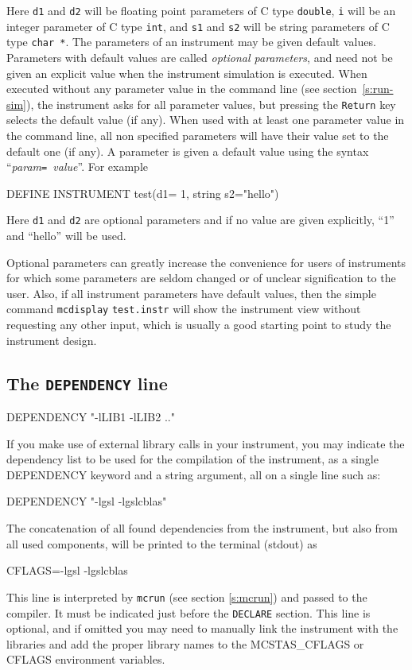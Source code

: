Here \verb+d1+ and \verb+d2+ will be floating point parameters of C type
\verb+double+, \verb+i+ will be an integer parameter of C type \verb+int+, and
\verb+s1+ and \verb+s2+ will be string parameters of C type \verb+char *+.
 The parameters of an instrument may
be given default values. Parameters with default values are called
\emph{optional parameters}, and need not be given an explicit value when the
instrument simulation is executed. When executed without any parameter value in
the command line (see section~\ref{s:run-sim}), the instrument asks for all
parameter values, but pressing the \verb+Return+ key selects the default value
(if any). When used with at least one parameter value in the command line, all
non specified parameters will have their value set to the default one (if
any). A parameter is given a default value using the syntax
``\textit{param}\texttt{= }\textit{value}''.  For example
\begin{mcstas}
DEFINE INSTRUMENT test(d1= 1, string s2="hello")
\end{mcstas}
Here \verb+d1+ and \verb+d2+ are optional parameters and if no
value are given explicitly, ``1'' and ``hello'' will be used.

Optional parameters can greatly increase the convenience for users of
instruments for which some parameters are seldom changed or of unclear
signification to the user. Also, if all instrument parameters have default
values, then the simple command \verb+mcdisplay+ \verb+test.instr+ will show the
instrument view without requesting any other input, which is usually a good
starting point to study the instrument design.

\subsection{The \texttt{DEPENDENCY} line}
\label{s:dependency}
\begin{mcstas}
DEPENDENCY "-lLIB1 -lLIB2 .."
\end{mcstas}

If you make use of external library calls in your instrument, you may indicate 
the dependency list to be used for the compilation of the instrument, as a single 
DEPENDENCY keyword and a string argument, all on a single line such as:
\begin{mcstas}
DEPENDENCY "-lgsl -lgslcblas"
\end{mcstas}
The concatenation of all found dependencies from the instrument, but also from 
all used components, will be printed to the terminal (stdout) as
\begin{mcstas}
CFLAGS=-lgsl -lgslcblas
\end{mcstas}
This line is interpreted by \verb+mcrun+ (see section \ref{s:mcrun}) and passed 
to the compiler. It must be indicated just before the \texttt{DECLARE} section.
This line is optional, and if omitted you may need to manually link the instrument with the libraries and add the proper library names to the MCSTAS\_CFLAGS or CFLAGS environment variables.

